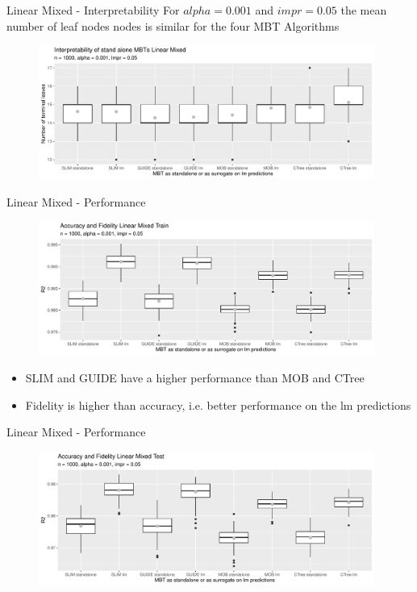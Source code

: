 \documentclass[9pt, xcolor=table]{beamer}
\begin{document}
\begin{frame}{Linear Mixed - Interpretability}
For  $alpha= 0.001$ and $impr = 0.05$ the mean number of leaf nodes nodes is similar for the four MBT Algorithms
\begin{figure}
    \includegraphics[width=11cm]{Figures/simulations/batchtools/basic_scenarios/linear_mixed/lm_1000_standalone_lm_int.pdf}
\end{figure}     
\end{frame}

\begin{frame}{Linear Mixed - Performance}

\begin{figure}
    \includegraphics[width=11cm]{Figures/simulations/batchtools/basic_scenarios/linear_mixed/lm_1000_standalone_lm_r2_train.pdf}
\end{figure}  
\begin{itemize}
    \item SLIM and GUIDE have a higher performance than MOB and CTree
    \item Fidelity is higher than accuracy, i.e. better performance on the lm predictions
\end{itemize}
\end{frame}

\begin{frame}{Linear Mixed - Performance}

\begin{figure}
    \includegraphics[width=11cm]{Figures/simulations/batchtools/basic_scenarios/linear_mixed/lm_1000_standalone_lm_r2_test.pdf}
\end{figure}  

\end{frame}
\end{document}
